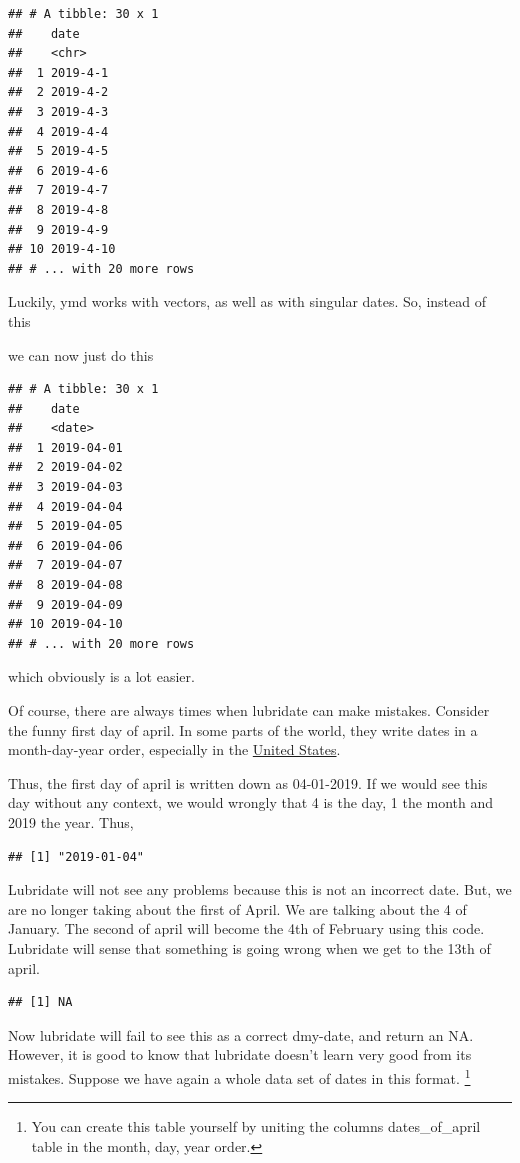 \documentclass[]{tufte-book}
\begin{document}
\begin{verbatim}
## # A tibble: 30 x 1
##    date     
##    <chr>    
##  1 2019-4-1 
##  2 2019-4-2 
##  3 2019-4-3 
##  4 2019-4-4 
##  5 2019-4-5 
##  6 2019-4-6 
##  7 2019-4-7 
##  8 2019-4-8 
##  9 2019-4-9 
## 10 2019-4-10
## # ... with 20 more rows
\end{verbatim}

Luckily, ymd works with vectors, as well as with singular dates. So, instead of this

we can now just do this

\begin{verbatim}
## # A tibble: 30 x 1
##    date      
##    <date>    
##  1 2019-04-01
##  2 2019-04-02
##  3 2019-04-03
##  4 2019-04-04
##  5 2019-04-05
##  6 2019-04-06
##  7 2019-04-07
##  8 2019-04-08
##  9 2019-04-09
## 10 2019-04-10
## # ... with 20 more rows
\end{verbatim}

which obviously is a lot easier.

Of course, there are always times when lubridate can make mistakes. Consider the funny first day of april. In some parts of the world, they write dates in a month-day-year order, especially in the \href{https://en.wikipedia.org/wiki/Date_and_time_notation_in_the_United_States}{United States}.

Thus, the first day of april is written down as 04-01-2019. If we would see this day without any context, we would wrongly that 4 is the day, 1 the month and 2019 the year. Thus,

\begin{verbatim}
## [1] "2019-01-04"
\end{verbatim}

Lubridate will not see any problems because this is not an incorrect date. But, we are no longer taking about the first of April. We are talking about the 4 of January. The second of april will become the 4th of February using this code. Lubridate will sense that something is going wrong when we get to the 13th of april.

\begin{verbatim}
## [1] NA
\end{verbatim}

Now lubridate will fail to see this as a correct dmy-date, and return an NA. However, it is good to know that lubridate doesn't learn very good from its mistakes. Suppose we have again a whole data set of dates in this format. \footnote{You can create this table yourself by uniting the columns dates\_of\_april table in the month, day, year order.}
\end{document}
